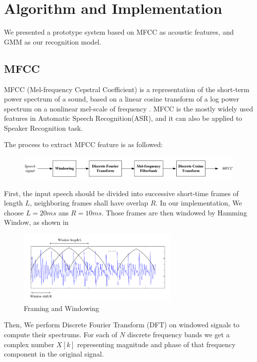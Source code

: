 

\section{Algorithm and Implementation}

We presented a prototype system based on MFCC as acoustic features, and
GMM as our recognition model.

\subsection{MFCC}
MFCC (Mel-frequency Cepstral Coefficient) is a representation of the short-term power spectrum of a sound,
based on a linear cosine transform of a log
power spectrum on a nonlinear mel-scale of frequency \cite{mfcc} .
MFCC is the mostly widely used features in Automatic Speech Recognition(ASR), and it can also be
applied to Speaker Recognition task.

The process to extract MFCC feature is as followed:
\begin{figure}[H]
  \centering
  \includegraphics[width=\textwidth]{res/MFCC.png}
\end{figure}

First, the input speech should be divided into successive short-time frames of length $L$,
neighboring frames shall have overlap $R$. In our implementation, We choose $L = 20ms  $ ans $ R = 10 ms$.
Those frames are then windowed by Hamming Window, as shown in 
\begin{figure}[H]
  \centering
  \includegraphics[width=0.7\textwidth]{res/frames.png}
  \caption{Framing and Windowing \label{fig:framming}}
\end{figure}

Then, We perform Discrete Fourier Transform (DFT) on windowed signals to compute their spectrums.
For each of $N$ discrete frequency bands we get a complex number $X[k]$ representing
magnitude and phase of that frequency component in the original signal.

